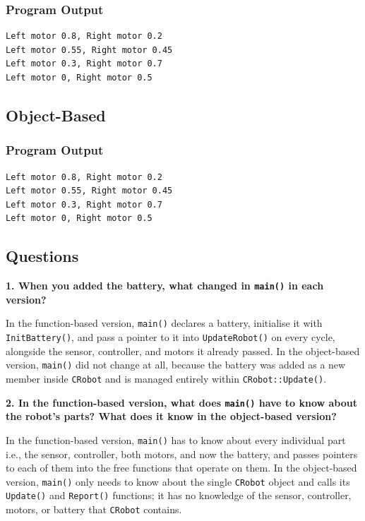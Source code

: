 \documentclass[10pt,a4paper]{article}
\newcommand{\question}[1]{%
    \vspace{5pt}
    \textbf{#1}\par
    \vspace{2pt}
}
\begin{document}
\subsubsection{Program Output}

\begin{lstlisting}[style=output]
Left motor 0.8, Right motor 0.2
Left motor 0.55, Right motor 0.45
Left motor 0.3, Right motor 0.7
Left motor 0, Right motor 0.5
\end{lstlisting}

\subsection{Object-Based}

\subsubsection{Program Output}

\begin{lstlisting}[style=output]
Left motor 0.8, Right motor 0.2
Left motor 0.55, Right motor 0.45
Left motor 0.3, Right motor 0.7
Left motor 0, Right motor 0.5
\end{lstlisting}

\subsection{Questions}

\question{1. When you added the battery, what changed in \texttt{main()} in each version?}

In the function-based version, \texttt{main()} declares a battery,
initialise it with \texttt{InitBattery()}, and pass a pointer to it into
\texttt{UpdateRobot()} on every cycle, alongside the sensor, controller,
and motors it already passed. In the object-based version, \texttt{main()}
did not change at all, because the battery was added as a new member
inside \texttt{CRobot} and is managed entirely within \texttt{CRobot::Update()}.

\question{2. In the function-based version, what does \texttt{main()} have to know about the robot's parts? What does it know in the object-based version?}

In the function-based version, \texttt{main()} has to know about every
individual part i.e., the sensor, controller, both motors, and now the
battery, and passes pointers to each of them into the free functions that
operate on them. In the object-based version, \texttt{main()} only needs
to know about the single \texttt{CRobot} object and calls its
\texttt{Update()} and \texttt{Report()} functions; it has no knowledge of
the sensor, controller, motors, or battery that \texttt{CRobot} contains.
\end{document}
